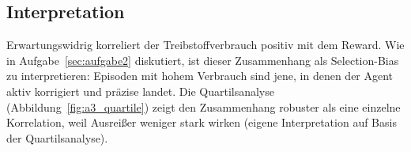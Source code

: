 \subsection{Interpretation}

Erwartungswidrig korreliert der Treibstoffverbrauch positiv mit dem Reward. Wie in Aufgabe~\ref{sec:aufgabe2} diskutiert, ist dieser Zusammenhang als Selection-Bias zu interpretieren: Episoden mit hohem Verbrauch sind jene, in denen der Agent aktiv korrigiert und präzise landet. Die Quartilsanalyse (Abbildung~\ref{fig:a3_quartile}) zeigt den Zusammenhang robuster als eine einzelne Korrelation, weil Ausreißer weniger stark wirken (eigene Interpretation auf Basis der Quartilsanalyse).

